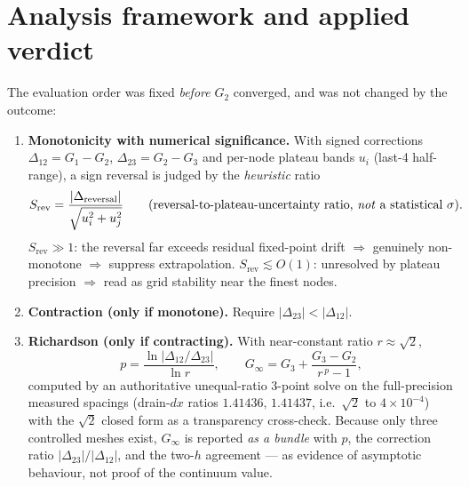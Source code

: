 \documentclass[11pt]{article}
\begin{document}
\section{Analysis framework and applied verdict}
The evaluation order was fixed \emph{before} $G_2$ converged, and was not changed by the outcome:
\begin{enumerate}[nosep]
  \item \textbf{Monotonicity with numerical significance.} With signed corrections
  $\Delta_{12}=G_1-G_2$, $\Delta_{23}=G_2-G_3$ and per-node plateau bands $u_i$ (last-4 half-range),
  a sign reversal is judged by the \emph{heuristic} ratio
  \[
    S_{\mathrm{rev}}=\frac{|\Delta_{\mathrm{reversal}}|}{\sqrt{u_i^2+u_j^2}}
    \qquad(\text{reversal-to-plateau-uncertainty ratio, \emph{not} a statistical }\sigma).
  \]
  $S_{\mathrm{rev}}\gg1$: the reversal far exceeds residual fixed-point drift $\Rightarrow$ genuinely
  non-monotone $\Rightarrow$ suppress extrapolation. $S_{\mathrm{rev}}\lesssim O(1)$: unresolved by
  plateau precision $\Rightarrow$ read as grid stability near the finest nodes.
  \item \textbf{Contraction (only if monotone).} Require $|\Delta_{23}|<|\Delta_{12}|$.
  \item \textbf{Richardson (only if contracting).} With near-constant ratio $r\approx\sqrt2$,
  \[
    p=\frac{\ln|\Delta_{12}/\Delta_{23}|}{\ln r},\qquad
    G_\infty=G_3+\frac{G_3-G_2}{r^{\,p}-1},
  \]
  computed by an authoritative unequal-ratio 3-point solve on the full-precision measured spacings
  (drain-$dx$ ratios $1.41436,\,1.41437$, i.e.\ $\sqrt2$ to $4\times10^{-4}$) with the
  $\sqrt2$ closed form as a transparency cross-check. Because only three controlled meshes exist,
  $G_\infty$ is reported \emph{as a bundle} with $p$, the correction ratio $|\Delta_{23}|/|\Delta_{12}|$,
  and the two-$h$ agreement --- as evidence of asymptotic behaviour, not proof of the continuum value.
\end{enumerate}
\end{document}
